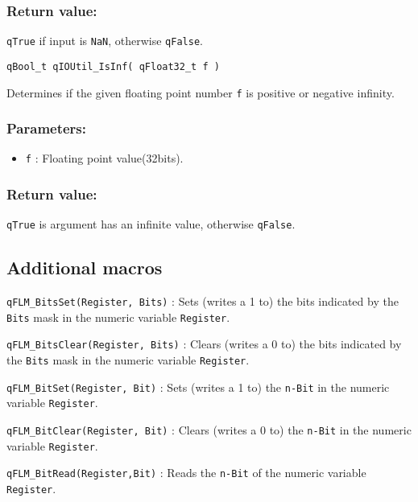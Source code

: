 \subsubsection*{Return value:}
\lstinline{qTrue} if input is \lstinline{NaN}, otherwise \lstinline{qFalse}.


\noindent\hrulefill

\begin{lstlisting}[style=CStyle]
qBool_t qIOUtil_IsInf( qFloat32_t f )
\end{lstlisting}

Determines if the given floating point number \lstinline{f} is positive or negative infinity. 

\subsubsection*{Parameters:}
\begin{itemize}
    \item \lstinline{f} : Floating point value(32bits).
\end{itemize}

\subsubsection*{Return value:}
\lstinline{qTrue} is argument has an infinite value, otherwise \lstinline{qFalse}.

\subsection{Additional macros}

\lstinline{qFLM_BitsSet(Register, Bits)} : Sets (writes a 1 to) the bits indicated by the \lstinline{Bits} mask in the numeric variable \lstinline{Register}.

\lstinline{qFLM_BitsClear(Register, Bits)} : Clears (writes a 0 to) the bits indicated by the \lstinline{Bits} mask in the numeric variable \lstinline{Register}.

\lstinline{qFLM_BitSet(Register, Bit)} : Sets (writes a 1 to) the \lstinline{n-Bit} in the numeric variable \lstinline{Register}.

\lstinline{qFLM_BitClear(Register, Bit)} : Clears (writes a 0 to) the \lstinline{n-Bit} in the numeric variable \lstinline{Register}.

\lstinline{qFLM_BitRead(Register,Bit)} : Reads the \lstinline{n-Bit} of the numeric variable \lstinline{Register}.

